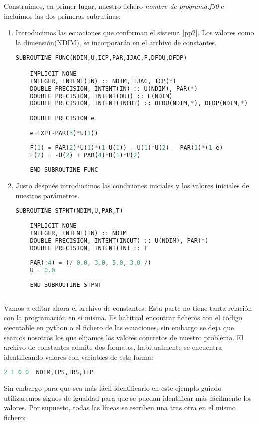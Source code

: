 Construimos, en primer lugar, nuestro fichero \textit{nombre-de-programa.f90} e incluimos las dos primeras subrutinas:

\begin{enumerate}
	\item Introducimos las ecuaciones que conforman el sistema \ref{pp2}. Los valores como la dimensión(NDIM), se incorporarán en el archivo de constantes. 
	\begin{lstlisting}[language=Python]
	SUBROUTINE FUNC(NDIM,U,ICP,PAR,IJAC,F,DFDU,DFDP) 

	IMPLICIT NONE
	INTEGER, INTENT(IN) :: NDIM, IJAC, ICP(*)
	DOUBLE PRECISION, INTENT(IN) :: U(NDIM), PAR(*)
	DOUBLE PRECISION, INTENT(OUT) :: F(NDIM)
	DOUBLE PRECISION, INTENT(INOUT) :: DFDU(NDIM,*), DFDP(NDIM,*)
	
	DOUBLE PRECISION e
	
	e=EXP(-PAR(3)*U(1)) 
	
	F(1) = PAR(2)*U(1)*(1-U(1)) - U(1)*U(2) - PAR(1)*(1-e) 
	F(2) = -U(2) + PAR(4)*U(1)*U(2) 
	
	END SUBROUTINE FUNC
	\end{lstlisting}
	
	\item Justo después introducimos las condiciones iniciales y los valores iniciales de nuestros parámetros.
	\begin{lstlisting}[language=Python]
	SUBROUTINE STPNT(NDIM,U,PAR,T)  
	
	IMPLICIT NONE
	INTEGER, INTENT(IN) :: NDIM
	DOUBLE PRECISION, INTENT(INOUT) :: U(NDIM), PAR(*)
	DOUBLE PRECISION, INTENT(IN) :: T
	
	PAR(:4) = (/ 0.0, 3.0, 5.0, 3.0 /)
	U = 0.0
	
	END SUBROUTINE STPNT
	
	\end{lstlisting}
	
\end{enumerate}


Vamos a editar ahora el archivo de constantes. Esta parte no tiene tanta relación con la programación en sí misma. Es habitual encontrar ficheros con el código ejecutable en python o el fichero de las ecuaciones, sin embargo se deja que seamos nosotros los que elijamos los valores concretos de nuestro problema.
El archivo de constantes admite dos formatos, habitualmente se encuentra identificando valores con variables de esta forma:
\begin{lstlisting}[language=Python]
2 1 0 0  NDIM,IPS,IRS,ILP
\end{lstlisting}
Sin embargo para que sea más fácil identificarlo en este ejemplo guiado utilizaremos signos de igualdad para que se puedan identificar más fácilmente los valores. Por supuesto, todas las líneas se escriben una tras otra en el mismo fichero:


